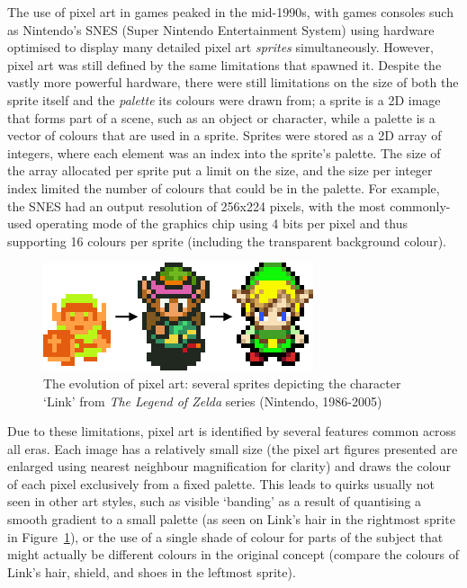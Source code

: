 \documentclass[12pt,twoside,notitlepage]{report}
\begin{document}
The use of pixel art in games peaked in the mid-1990s, with games consoles such as Nintendo's SNES (Super Nintendo Entertainment System) using hardware optimised to display many detailed pixel art \textit{sprites} simultaneously. However, pixel art was still defined by the same limitations that spawned it. Despite the vastly more powerful hardware, there were still limitations on the size of both the sprite itself and the \textit{palette} its colours were drawn from; a sprite is a 2D image that forms part of a scene, such as an object or character, while a palette is a vector of colours that are used in a sprite. Sprites were stored as a 2D array of integers, where each element was an index into the sprite's palette. The size of the array allocated per sprite put a limit on the size, and the size per integer index limited the number of colours that could be in the palette. For example, the SNES had an output resolution of 256x224 pixels, with the most commonly-used operating mode of the graphics chip using 4 bits per pixel and thus supporting 16 colours per sprite (including the transparent background colour).

\begin{figure}[h!]
\centering
\includegraphics{linksprite}
\caption{The evolution of pixel art: several sprites depicting the character `Link' from \textit{The Legend of Zelda} series (Nintendo, 1986-2005)}
\label{fig:link}
\end{figure}

Due to these limitations, pixel art is identified by several features common across all eras. Each image has a relatively small size (the pixel art figures presented are enlarged using nearest neighbour magnification for clarity) and draws the colour of each pixel exclusively from a fixed palette. This leads to quirks usually not seen in other art styles, such as visible `banding' as a result of quantising a smooth gradient to a small palette (as seen on Link's hair in the rightmost sprite in Figure~\ref{fig:link}), or the use of a single shade of colour for parts of the subject that might actually be different colours in the original concept (compare the colours of Link's hair, shield, and shoes in the leftmost sprite).
\end{document}
